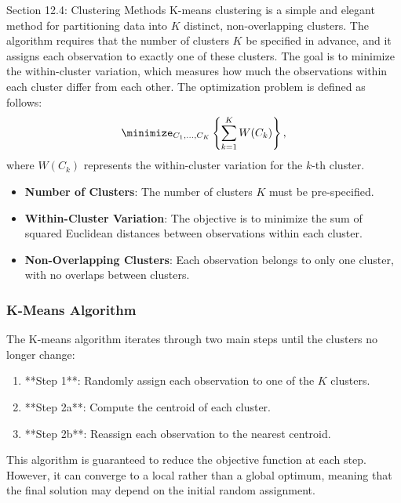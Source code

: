 \begin{notes}{Section 12.4: Clustering Methods}
    K-means clustering is a simple and elegant method for partitioning data into \( K \) distinct, non-overlapping clusters. The algorithm requires that the number of clusters \( K \) be specified in advance, 
    and it assigns each observation to exactly one of these clusters. The goal is to minimize the within-cluster variation, which measures how much the observations within each cluster differ from each other. 
    The optimization problem is defined as follows:
    \[
    \minimize_{C_1, \dots, C_K} \left\{ \sum_{k=1}^{K} W(C_k) \right\},
    \]
    where \( W(C_k) \) represents the within-cluster variation for the \( k \)-th cluster.
    
    \begin{highlight}
        \begin{itemize}
            \item \textbf{Number of Clusters}: The number of clusters \( K \) must be pre-specified.
            \item \textbf{Within-Cluster Variation}: The objective is to minimize the sum of squared Euclidean distances between observations within each cluster.
            \item \textbf{Non-Overlapping Clusters}: Each observation belongs to only one cluster, with no overlaps between clusters.
        \end{itemize}
    \end{highlight}
    
    \subsubsection*{K-Means Algorithm}
    
    The K-means algorithm iterates through two main steps until the clusters no longer change:
    \begin{enumerate}
        \item **Step 1**: Randomly assign each observation to one of the \( K \) clusters.
        \item **Step 2a**: Compute the centroid of each cluster.
        \item **Step 2b**: Reassign each observation to the nearest centroid.
    \end{enumerate}
    This algorithm is guaranteed to reduce the objective function at each step. However, it can converge to a local rather than a global optimum, meaning that the final solution may depend on the initial random assignment.
    

\end{notes}
